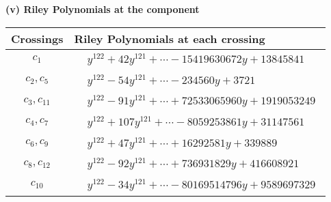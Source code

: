 \documentclass[1p]{elsarticle_modified}
\theoremstyle{definition}
\begin{document}
\newpage\renewcommand{\arraystretch}{1}
\flushleft \textbf{(v) Riley Polynomials at the component}\newline \\
\begin{tabular}{m{50pt}|m{274pt}}
Crossings & \hspace{64pt}Riley Polynomials at each crossing \\
\hline $$\begin{aligned}c_{1}\end{aligned}$$&$\begin{aligned}
&y^{122}+42 y^{121}+\cdots-15419630672 y+13845841
\end{aligned}$\\
\hline $$\begin{aligned}c_{2},c_{5}\end{aligned}$$&$\begin{aligned}
&y^{122}-54 y^{121}+\cdots-234560 y+3721
\end{aligned}$\\
\hline $$\begin{aligned}c_{3},c_{11}\end{aligned}$$&$\begin{aligned}
&y^{122}-91 y^{121}+\cdots+72533065960 y+1919053249
\end{aligned}$\\
\hline $$\begin{aligned}c_{4},c_{7}\end{aligned}$$&$\begin{aligned}
&y^{122}+107 y^{121}+\cdots-8059253861 y+31147561
\end{aligned}$\\
\hline $$\begin{aligned}c_{6},c_{9}\end{aligned}$$&$\begin{aligned}
&y^{122}+47 y^{121}+\cdots+16292581 y+339889
\end{aligned}$\\
\hline $$\begin{aligned}c_{8},c_{12}\end{aligned}$$&$\begin{aligned}
&y^{122}-92 y^{121}+\cdots+736931829 y+416608921
\end{aligned}$\\
\hline $$\begin{aligned}c_{10}\end{aligned}$$&$\begin{aligned}
&y^{122}-34 y^{121}+\cdots-80169514796 y+9589697329
\end{aligned}$\\
\hline
\end{tabular}\\~\\
\end{document}

